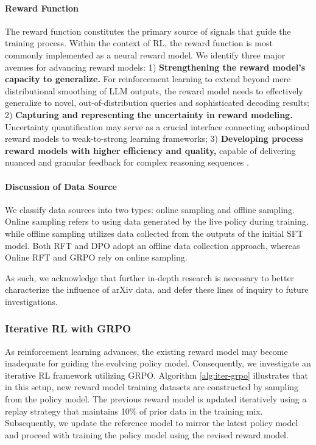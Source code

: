 \begin{itemize}[topsep=0pt]
\paragraph{Reward Function} The reward function constitutes the primary source of signals that guide the training process. Within the context of RL, the reward function is most commonly implemented as a neural reward model. We identify three major avenues for advancing reward models: 1) \textbf{Strengthening the reward model’s capacity to generalize.} For reinforcement learning to extend beyond mere distributional smoothing of LLM outputs, the reward model needs to effectively generalize to novel, out-of-distribution queries and sophisticated decoding results; 2) \textbf{Capturing and representing the uncertainty in reward modeling.} Uncertainty quantification may serve as a crucial interface connecting suboptimal reward models to weak-to-strong learning frameworks; 3) \textbf{Developing process reward models with higher efficiency and quality,} capable of delivering nuanced and granular feedback for complex reasoning sequences \citep{lightman2023let,wang2023math}.

\paragraph{Discussion of Data Source} We classify data sources into two types: online sampling and offline sampling. Online sampling refers to using data generated by the live policy during training, while offline sampling utilizes data collected from the outputs of the initial SFT model. Both RFT and DPO adopt an offline data collection approach, whereas Online RFT and GRPO rely on online sampling.

As such, we acknowledge that further in-depth research is necessary to better characterize the influence of arXiv data, and defer these lines of inquiry to future investigations.

\subsubsection{Iterative RL with GRPO} As reinforcement learning advances, the existing reward model may become inadequate for guiding the evolving policy model. Consequently, we investigate an iterative RL framework utilizing GRPO. Algorithm \ref{alg:iter-grpo} illustrates that in this setup, new reward model training datasets are constructed by sampling from the policy model. The previous reward model is updated iteratively using a replay strategy that maintains 10\% of prior data in the training mix. Subsequently, we update the reference model to mirror the latest policy model and proceed with training the policy model using the revised reward model.


\end{itemize}
